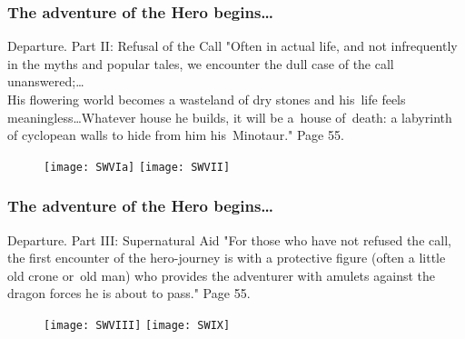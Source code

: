 \documentclass[10pt,t]{beamer}
\begin{document}
\begin{frame}
  \frametitle{The adventure of the Hero begins\ldots}

  \begin{block}{Departure. Part II: Refusal of the Call}
    "Often in actual life, and not infrequently in the myths and
    popular
    tales, we encounter the dull case of the call unanswered;\ldots \\
    His flowering world becomes a wasteland of dry stones and his~life
    feels meaningless\ldots Whatever house he builds, it will be
    a~house of~death: a labyrinth of cyclopean walls to hide from him
    his~Minotaur." Page 55.
  \end{block}

  \begin{block}{}
    \begin{figure}
      \centering

      \texttt{[image: SWVIa]}
      \texttt{[image: SWVII]}
    \end{figure}
  \end{block}

\end{frame}



\begin{frame}
  \frametitle{The adventure of the Hero begins\ldots}

  \begin{block}{Departure. Part III: Supernatural Aid}
    "For those who have not refused the call, the first encounter of
    the hero-journey is with a protective figure (often a little old
    crone or~old man) who provides the adventurer with amulets against
    the dragon forces he is about to pass." Page 55.
  \end{block}

  \begin{block}{}
    \begin{figure}
      \centering

      \texttt{[image: SWVIII]}
      \texttt{[image: SWIX]}
    \end{figure}
  \end{block}

\end{frame}
\end{document}
